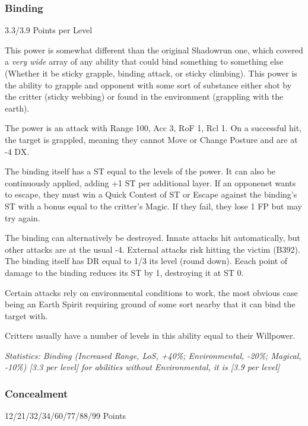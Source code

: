 \begin{multicols*}{3}
	
	\subsubsection{Binding}\label{binding}
	\begin{flushright}
		3.3/3.9 Points per Level
	\end{flushright}
	
	This power is somewhat different than the original Shadowrun one, which covered a \textit{very wide} array of any ability that could bind something to something else (Whether it be sticky grapple, binding attack, or sticky climbing). This power is the ability to grapple and opponent with some sort of substance either shot by the critter (sticky webbing) or found in the environment (grappling with the earth).
	
	The power is an attack with Range 100, Acc 3, RoF 1, Rcl 1. On a successful hit, the target is grappled, meaning they cannot Move or Change Posture and are at -4 DX. 
	
	The binding itself has a ST equal to the levels of the power. It can also be continuously applied, adding +1 ST per additional layer. If an opponenet wants to escape, they must win a Quick Contest of ST or Escape against the binding's ST with a bonus equal to the critter's Magic. If they fail, they lose 1 FP but may try again. 
	
	The binding can alternatively be destroyed. Innate attacks hit automatically, but other attacks are at the usual -4. External attacks risk hitting the victim (B392). The binding itself has DR equal to 1/3 its level (round down). Eeach point of damage to the binding reduces its ST by 1, destroying it at ST 0.
	
	Certain attacks rely on environmental conditions to work, the most obvious case being an Earth Spirit requiring ground of some sort nearby that it can bind the target with.
	
	Critters usually have a number of levels in this ability equal to their Willpower.
	
	\textcolor{OliveGreen}{\textit{Statistics: Binding (Increased Range, LoS, +40\%; Environmental, -20\%; Magical, -10\%) [3.3 per level] for abilities without Environmental, it is [3.9 per level]}}
	
	
	\subsubsection{Concealment}\label{concealment}
	\begin{flushright}
		12/21/32/34/60/77/88/99 Points
	\end{flushright}
	

\end{multicols*}
